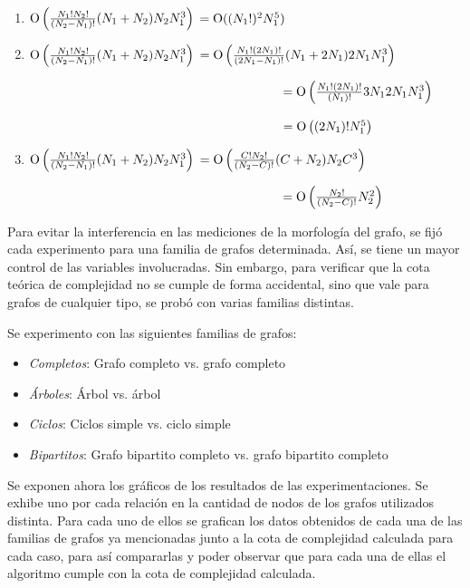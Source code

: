 \begin{enumerate}[label=\alph*.]
\item
$\operatorname{O}\left(\frac{N_1!  N_2!}{(N_2 - N_1)!} (N_1 + N_2)  N_2  N_1^3\right)$
$=\operatorname{O}((N_1!)^2 N_1^5)$

\item
$\operatorname{O}\left(\frac{N_1!  N_2!}{(N_2 - N_1)!} (N_1 + N_2)  N_2  N_1^3\right)$
$=\operatorname{O}\left(\frac{N_1! (2N_1)!}{(2N_1 - N_1)!} (N_1 + 2N_1)  2N_1  N_1^3\right)$

\ \ \ \ \ \ \ \ \ \ \ \ \ \ \ \ \ \ \ \ \ \ \ \ \ \ \ \ \ \ \ \ \ \ \ \ \ \ \ \ 
$=\operatorname{O}\left(\frac{N_1! (2N_1)!}{(N_1)!} 3N_1 2N_1  N_1^3\right)$

\ \ \ \ \ \ \ \ \ \ \ \ \ \ \ \ \ \ \ \ \ \ \ \ \ \ \ \ \ \ \ \ \ \ \ \ \ \ \ \ 
$=\operatorname{O}\left((2N_1)! N_1^5\right)$

\item
$\operatorname{O}\left(\frac{N_1!  N_2!}{(N_2 - N_1)!} (N_1 + N_2)  N_2  N_1^3\right)$
$=\operatorname{O}\left(\frac{C! N_2!}{(N_2 - C)!} (C + N_2)  N_2  C^3\right)$

\ \ \ \ \ \ \ \ \ \ \ \ \ \ \ \ \ \ \ \ \ \ \ \ \ \ \ \ \ \ \ \ \ \ \ \ \ \ \ \ 
$=\operatorname{O}\left(\frac{N_2!}{(N_2 - C)!}N_2^2\right)$
\end{enumerate}

Para evitar la interferencia en las mediciones de la morfología del grafo, se
fijó cada experimento para una familia de grafos determinada. Así, se tiene un
mayor control de las variables involucradas. Sin embargo, para verificar que
la cota teórica de complejidad no se cumple de forma accidental, sino que vale
para grafos de cualquier tipo, se probó con varias familias distintas.

Se experimento con las siguientes familias de grafos:

\begin{itemize}
\item \textit{Completos}: Grafo completo vs. grafo completo
\item \textit{Árboles}: Árbol vs. árbol
\item \textit{Ciclos}: Ciclos simple vs. ciclo simple
\item \textit{Bipartitos}: Grafo bipartito completo vs. grafo bipartito
completo
\end{itemize}

Se exponen ahora los gráficos de los resultados de las experimentaciones. Se
exhibe uno por cada relación en la cantidad de nodos de los grafos utilizados
distinta. Para cada uno de ellos se grafican los datos obtenidos de cada una
de las familias de grafos ya mencionadas junto a la cota de complejidad
calculada para cada caso, para así compararlas y poder observar que para cada
una de ellas el algoritmo cumple con la cota de complejidad calculada.

